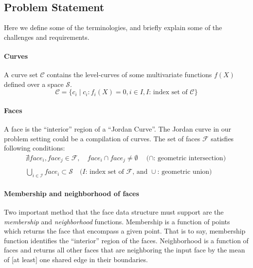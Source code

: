 \subsection{Problem Statement}

Here we define some of the terminologies, and briefly explain some of the challenges and requirements.

\paragraph{Curves}
A curve set $\mathcal{C}$ contains the level-curves of some multivariate functions $f(X)$ defined over a space $\mathcal{S}$.
\[
\mathcal{C} = \lbrace c_i \mid c_i: f_i(X)=0, i \in I, \text{$I$: index set of $\mathcal{C}$} \rbrace
\]

\paragraph{Faces}
A face is the ``interior'' region of a ``Jordan Curve''.
The Jordan curve in our problem setting could be a compilation of curves.
The set of faces $\mathcal{F}$ satisfies following conditions:
\[
\begin{array}{l}
  \nexists face_i , face_j \in \mathcal{F}, \quad face_i \cap face_j \neq \emptyset \quad \text{($\cap$: geometric intersection)}\\
  \quad \\
  \displaystyle\bigcup_{ i \in \mathcal{I} } face_i \subset \mathcal{S} \quad \text{($I$: index set of $\mathcal{F}$, and $\cup$: geometric union)}
\end{array}
\]

\paragraph{Membership and neighborhood of faces}
Two important method that the face data structure must support are the \emph{membership} and \emph{neighborhood} functions.
Membership is a function of points which returns the face that encompass a given point.
That is to say, membership function identifies the ``interior'' region of the faces.
Neighborhood is a function of faces and returns all other faces that are neighboring the input face by the mean of [at least] one shared edge in their boundaries.

